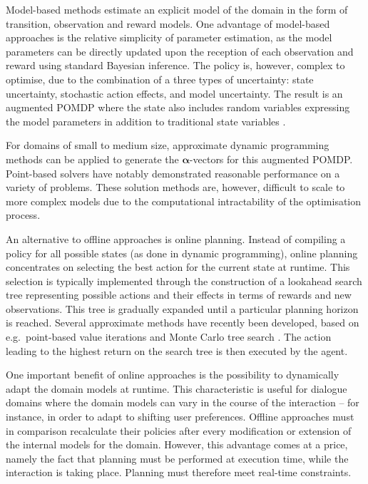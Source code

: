 Model-based methods estimate an explicit model of the domain in the form of transition, observation and reward models.  One advantage of model-based approaches is the relative simplicity of parameter estimation, as the model parameters can be directly updated upon the reception of each observation and reward using standard Bayesian inference. The policy is, however, complex to optimise, due to the combination of a three types of uncertainty: state uncertainty, stochastic action effects, and model uncertainty. The result is an augmented POMDP where the state also includes random variables expressing the model parameters in addition to traditional state variables \citep{Duff:2002,Ross:2011}. 

For domains of small to medium size, approximate dynamic programming methods can be applied to generate the $\boldsymbol\alpha$-vectors for this augmented POMDP.  Point-based solvers \citep{Porta:2006,shani2013} have notably demonstrated reasonable performance on a variety of problems. These solution methods are, however, difficult to scale to more complex models due to the computational intractability of the optimisation process.    

An alternative to offline approaches is online planning.  Instead of compiling a policy for all possible states (as done in dynamic programming), online planning concentrates on selecting the best action for the current state at runtime. This selection is typically implemented through the construction of a lookahead search tree representing possible actions and their effects in terms of rewards and new observations. This tree is gradually expanded until a particular planning horizon is reached.  Several approximate methods have recently been developed, based on e.g.\ point-based value iterations \citep{ross2008} and Monte Carlo tree search \citep{NIPS2010_0740}. The action leading to the highest return on the search tree is then executed by the agent.  

One important benefit of online approaches is the possibility to dynamically adapt the domain models at runtime. This characteristic is useful for dialogue domains where the domain models can vary in the course of the interaction -- for instance, in order to adapt to shifting user preferences. Offline approaches must in comparison recalculate their policies after every modification or extension of the internal models for the domain.   However, this advantage comes at a price, namely the fact that planning must be performed at execution time, while the interaction is taking place.  Planning must therefore meet real-time constraints. 


